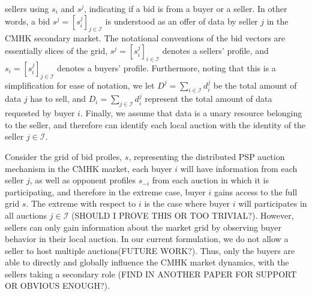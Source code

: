 \documentclass[12pt]{article}
\theoremstyle{definition}
\newcommand{\mcI}{\mathcal{I}}
\begin{document}
\begin{multicols}{2}
sellers using
$s_i$ and $s^j$, indicating if a bid is from a buyer or a seller.
In other words, a bid $s^j =
[s_i^j]_{j\in\mcI}$ is understood as an offer of data by seller $j$ in the CMHK
secondary market. The notational conventions of the bid vectors are essentially 
slices of the grid, $s^j = [s_i^j]_{i\in\mcI}$ denotes a sellers' profile, and $s_i =
[s_i^j]_{j\in\mcI}$ denotes a buyers' profile. 
Furthermore, noting that this is a simplification for ease of notation, we let $D^j = \sum_{i\in\mcI}
d_i^j$ be the total amount of data $j$ has to sell, and $D_i = \sum_{j\in\mcI}
d_i^j$ represent the
total amount of data requested by buyer $i$. 
Finally, we assume that data is a unary resource belonging to the seller, and
therefore can identify each local auction
with the identity of the seller $j\in\mcI$.

Consider the grid of bid proiles, $s$, representing the distributed PSP auction
mechanism in the CMHK market, each buyer $i$ will
have information from each seller $j$, as well as opponent profiles $s_{-i}$
from each auction in which it is participating, and therefore
in the extreme case, buyer $i$ gains access to the full grid $s$. The extreme with respect to
$i$ is the case where buyer $i$ will participates in all auctions $j\in\mcI$
(SHOULD I PROVE THIS OR TOO TRIVIAL?). However, 
sellers can only gain information about the market grid by observing buyer
behavior in their local auction.
In our current formulation, we do not allow a seller to host multiple
auctions(FUTURE WORK?). Thus, only the buyers are able to directly and globally
influence the CMHK market dynamics, with the sellers taking a secondary role
(FIND IN ANOTHER PAPER FOR SUPPORT OR OBVIOUS ENOUGH?).


\end{multicols}
\end{document}
